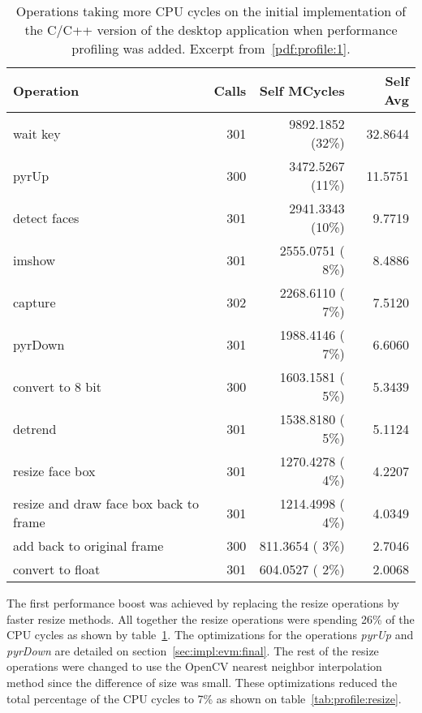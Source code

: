 \begin{table}
  \centering
  \begin{tabular}{lrrr}
    \hline
    Operation & Calls & Self MCycles & Self Avg \\
    \hline
    wait key                                & 301 & 9892.1852 (32\%) & 32.8644 \\
    pyrUp                                   & 300 & 3472.5267 (11\%) & 11.5751 \\
    detect faces                            & 301 & 2941.3343 (10\%) & 9.7719  \\
    imshow                                  & 301 & 2555.0751 ( 8\%) & 8.4886  \\
    capture                                 & 302 & 2268.6110 ( 7\%) & 7.5120  \\
    pyrDown                                 & 301 & 1988.4146 ( 7\%) & 6.6060  \\
    convert to 8 bit                        & 300 & 1603.1581 ( 5\%) & 5.3439  \\
    detrend                                 & 301 & 1538.8180 ( 5\%) & 5.1124  \\
    resize face box                         & 301 & 1270.4278 ( 4\%) & 4.2207  \\
    resize and draw face box back to frame  & 301 & 1214.4998 ( 4\%) & 4.0349  \\
    add back to original frame              & 300 & 811.3654  ( 3\%) & 2.7046  \\
    convert to float                        & 301 & 604.0527  ( 2\%) & 2.0068  \\
    \hline
  \end{tabular}
  \caption{
    Operations taking more CPU cycles on the initial implementation of
    the C/C++ version of the desktop application when performance
    profiling was added. Excerpt from~\ref{pdf:profile:1}.
  }
  \label{tab:profile:top}
\end{table}

The first performance boost was achieved by replacing the resize operations
by faster resize methods. All together the resize operations were spending
26\% of the CPU cycles as shown by table~\ref{tab:profile:top}.
The optimizations for the operations \emph{pyrUp} and
\emph{pyrDown} are detailed on section~\ref{sec:impl:evm:final}.
The rest of the resize operations were changed to use the OpenCV
nearest neighbor interpolation method since the difference of size was small.
These optimizations reduced the total percentage of the CPU cycles
to 7\% as shown on table~\ref{tab:profile:resize}.

